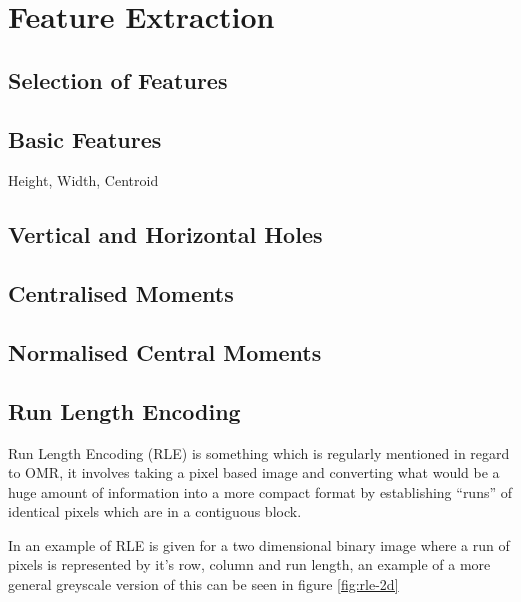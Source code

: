 \section{Feature Extraction}

\subsection{Selection of Features}

\subsection{Basic Features}
Height, Width, Centroid

\subsection{Vertical and Horizontal Holes}

\subsection{Centralised Moments}

\subsection{Normalised Central Moments}

\subsection{Run Length Encoding}
\label{sec:tb-rle}

Run Length Encoding (RLE) is something which is regularly mentioned in regard to OMR, it involves taking a pixel based image and converting what would be a huge amount of information into a more compact format by establishing ``runs'' of identical pixels which are in a contiguous block.

In \cite{burger2009principles} an example of RLE is given for a two dimensional binary image where a run of pixels is represented by it's row, column and run length, an example of a more general greyscale version of this can be seen in figure \ref{fig:rle-2d}

